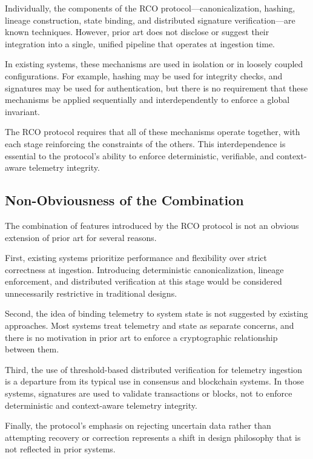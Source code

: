 Individually, the components of the RCO protocol—canonicalization, hashing, lineage construction, state binding, and distributed signature verification—are known techniques. However, prior art does not disclose or suggest their integration into a single, unified pipeline that operates at ingestion time.

In existing systems, these mechanisms are used in isolation or in loosely coupled configurations. For example, hashing may be used for integrity checks, and signatures may be used for authentication, but there is no requirement that these mechanisms be applied sequentially and interdependently to enforce a global invariant.

The RCO protocol requires that all of these mechanisms operate together, with each stage reinforcing the constraints of the others. This interdependence is essential to the protocol’s ability to enforce deterministic, verifiable, and context-aware telemetry integrity.

\subsection{Non-Obviousness of the Combination}

The combination of features introduced by the RCO protocol is not an obvious extension of prior art for several reasons.

First, existing systems prioritize performance and flexibility over strict correctness at ingestion. Introducing deterministic canonicalization, lineage enforcement, and distributed verification at this stage would be considered unnecessarily restrictive in traditional designs.

Second, the idea of binding telemetry to system state is not suggested by existing approaches. Most systems treat telemetry and state as separate concerns, and there is no motivation in prior art to enforce a cryptographic relationship between them.

Third, the use of threshold-based distributed verification for telemetry ingestion is a departure from its typical use in consensus and blockchain systems. In those systems, signatures are used to validate transactions or blocks, not to enforce deterministic and context-aware telemetry integrity.

Finally, the protocol’s emphasis on rejecting uncertain data rather than attempting recovery or correction represents a shift in design philosophy that is not reflected in prior systems.

